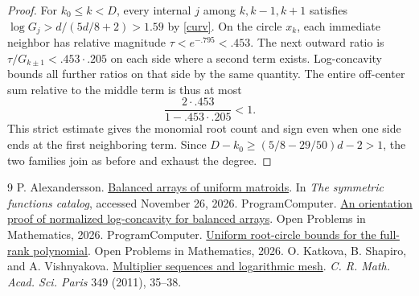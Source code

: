 \documentclass[11pt]{article}
\begin{document}
\begin{proof}
For $k_0\le k<D$, every internal $j$ among $k,k-1,k+1$ satisfies $\log G_j>d/(5d/8+2)>1.59$ by \eqref{curv}. On the circle $x_k$, each immediate neighbor has relative magnitude $\tau<e^{-.795}<.453$. The next outward ratio is $\tau/G_{k\pm1}<.453\cdot .205$ on each side where a second term exists. Log-concavity bounds all further ratios on that side by the same quantity. The entire off-center sum relative to the middle term is thus at most
\[
 \frac{2\cdot .453}{1-.453\cdot .205}<1 .
\]
This strict estimate gives the monomial root count and sign even when one side ends at the first neighboring term. Since $D-k_0\ge(5/8-29/50)d-2>1$, the two families join as before and exhaust the degree.
\end{proof}

\begin{thebibliography}{9}
 P. Alexandersson. \href{https://www.symmetricfunctions.com/realRootedOpenProblems.htm\#conjBalancedArrays}{Balanced arrays of uniform matroids}. In \emph{The symmetric functions catalog}, accessed November 26, 2026.
 ProgramComputer. \href{https://github.com/ProgramComputer/open-math-research/blob/2cadc6002bda2bec41c982f5899cad820033074e/topics/balanced-arrays/orientation-normalization.md}{An orientation proof of normalized log-concavity for balanced arrays}. Open Problems in Mathematics, 2026.
 ProgramComputer. \href{https://github.com/ProgramComputer/open-math-research/blob/2cadc6002bda2bec41c982f5899cad820033074e/topics/balanced-arrays/dense-regime/below-cap/full-rank-root-stability.md}{Uniform root-circle bounds for the full-rank polynomial}. Open Problems in Mathematics, 2026.
 O. Katkova, B. Shapiro, and A. Vishnyakova. \href{https://doi.org/10.1016/j.crma.2010.11.031}{Multiplier sequences and logarithmic mesh}. \emph{C. R. Math. Acad. Sci. Paris} 349 (2011), 35--38.
\end{thebibliography}
\end{document}
